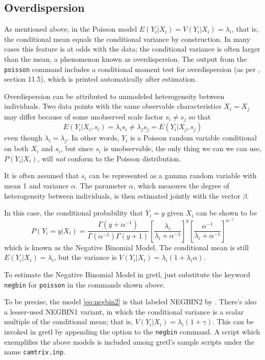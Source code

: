 \subsection{Overdispersion}

As mentioned above, in the Poisson model
$E(Y_i | X_i) = V(Y_i | X_i) = \lambda_i$, that is, the conditional
mean equals the conditional variance by construction. In many cases
this feature is at odds with the data; the conditional variance is
often larger than the mean, a phenomenon known as overdispersion. The
output from the \texttt{poisson} command includes a conditional moment
test for overdispersion (as per \citet{davidson-mackinnon04}, section
11.5), which is printed automatically after estimation.

Overdispersion can be attributed to unmodeled heterogeneity between
individuals. Two data points with the same observable characteristics
$X_i = X_j$ may differ because of some unobserved scale factor $s_i
\ne s_j$ so that
\[
   E(Y_i | X_i, s_i) = \lambda_i s_i \ne \lambda_j s_j = E(Y_i | X_j, s_j)
\]
even though $\lambda_i = \lambda_j$. In other words, $Y_i$ is a
Poisson random variable conditional on both $X_i$ and $s_i$, but since
$s_i$ is unobservable, the only thing we can we can use,
$P(Y_i | X_i)$, will \textit{not} conform to the Poisson distribution.

It is often assumed that $s_i$ can be represented as a gamma random
variable with mean 1 and variance $\alpha$. The parameter $\alpha$,
which measures the degree of heterogeneity between individuals, is
then estimated jointly with the vector $\beta$.

In this case, the conditional probability that $Y_i = y$ given $X_i$
can be shown to be
  \begin{equation}
    \label{eq:negbin2}
  P(Y_i = y | X_i) = 
  \frac{\Gamma(y + \alpha^{-1})}{\Gamma(\alpha^{-1})\Gamma(y + 1)}
  \left[ \frac{\lambda_i} {\lambda_i + \alpha^{-1} }\right]^{y}
  \left[ \frac{\alpha^{-1}} {\lambda_i + \alpha^{-1} }\right]^{\alpha^{-1}}
\end{equation}
which is known as the Negative Binomial Model. The conditional
mean is still $E(Y_i | X_i) = \lambda_i$, but the variance is $V(Y_i |
X_i) = \lambda_i \left( 1 + \lambda_i \alpha \right)$.

To estimate the Negative Binomial Model in gretl, just substitute the
keyword \texttt{negbin} for \texttt{poisson} in the commands shown
above.

To be precise, the model \ref{eq:negbin2} is that labeled NEGBIN2 by
\cite{cameron-trivedi86}. There's also a lesser-used NEGBIN1 variant,
in which the conditional variance is a scalar multiple of the
conditional mean; that is,
$V(Y_i | X_i) = \lambda_i \left( 1 + \gamma \right)$. This can be
invoked in gretl by appending the option  to the
\texttt{negbin} command. A script which exemplifies the above models
is included among gretl's sample scripts under the name
\texttt{camtriv.inp}.


